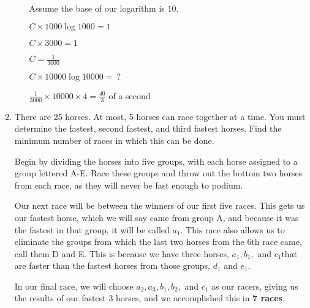 \documentclass[12pt]{article}
\begin{document}
\begin{enumerate}
\begin{enumerate}
            Assume the base of our logarithm is $10$.

            $C \times 1000 \log 1000 = 1$
            
            $C \times 3000 = 1$

            $C = \frac{1}{3000}$

            $C \times 10000 \log 10000 =\ ?$

            $\frac{1}{3000} \times 10000 \times 4 = \frac{40}{3}$ of a second
    \end{enumerate}
\pagebreak
\item There are 25 horses. At most, 5 horses can race together at a time. You must
determine the fastest, second fastest, and third fastest horses. Find the minimum
number of races in which this can be done.
\vspace{0.25in}

Begin by dividing the horses into five groups, with each horse assigned to a group lettered A-E.
Race these groups and throw out the bottom two horses from each race, as they will
never be fast enough to podium.

Our next race will be between the winners of our first five races. This gets us our
fastest horse, which we will say came from group A, and because it was the fastest
in that group, it will be called $a_1$. This race also allows us to eliminate the
groups from which the last two horses from the 6th race came, call them D and E.
This is because we have three horses, $a_1, b_1,$ and $ c_1$that are faster than
the fastest horses from those groups, $d_1$ and $e_1$.

In our final race, we will choose $a_2, a_3, b_1, b_2,$ and $c_1$ as our racers,
giving us the results of our fastest 3 horses, and we accomplished this in {\bf 7 races}.


\end{enumerate}
\end{document}
